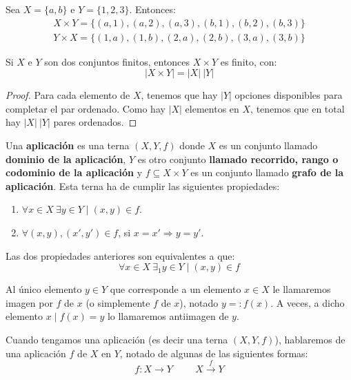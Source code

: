 \begin{ejemplo}
    Sea $X=\{a,b\}$ e $Y=\{1,2,3\}$. Entonces:
    \begin{gather*}
        X\times Y = \{(a,1), (a,2), (a,3), (b,1), (b,2), (b,3)\} \\
        Y\times X = \{(1,a), (1,b), (2,a), (2,b), (3,a), (3,b)\}
    \end{gather*}
\end{ejemplo}

\begin{prop}
    Si $X$ e $Y$ son dos conjuntos finitos, entonces $X\times Y$ es finito, con:
    \begin{equation*}
        |X\times Y|=|X|~|Y|
    \end{equation*}
\end{prop}
\begin{proof}
    Para cada elemento de $X$, tenemos que hay $|Y|$ opciones disponibles para completar el par ordenado. Como hay $|X|$ elementos en $X$, tenemos que en total hay $|X|~|Y|$ pares ordenados.
\end{proof}


\begin{definicion}[Aplicación]
    Una \textbf{aplicación} es una terna $(X, Y, f)$ donde $X$ es un conjunto llamado \textbf{dominio de la aplicación}, $Y$ es otro conjunto \textbf{llamado recorrido, rango o codominio de la aplicación} y $f\subseteq X\times Y$ es un conjunto llamado \textbf{grafo de la aplicación}. Esta terna ha de cumplir las siguientes propiedades:
    \begin{enumerate}
        \item $\forall x \in X~\exists y \in Y \mid (x, y) \in f$.
        \item $\forall (x,y), (x',y') \in f$, si $x=x'\Rightarrow y=y'$.
    \end{enumerate}
\end{definicion}

Las dos propiedades anteriores son equivalentes a que:
$$\forall x \in X~\exists_1 y \in Y \mid (x,y) \in f$$

Al único elemento $y \in Y$ que corresponde a un elemento $x \in X$ le llamaremos imagen por $f$ de $x$ (o simplemente $f$ de $x$), notado $y=:f(x)$. A veces, a dicho elemento $x\mid f(x)=y$ lo llamaremos antiimagen de $y$.

Cuando tengamos una aplicación (es decir una terna $(X, Y, f)$), hablaremos de una aplicación $f$ de $X$ en $Y$, notado de algunas de las siguientes formas:
\begin{equation*}
    f:X\longrightarrow Y
    \hspace{1cm}
    X \stackrel{f}{\longrightarrow} Y
\end{equation*}

